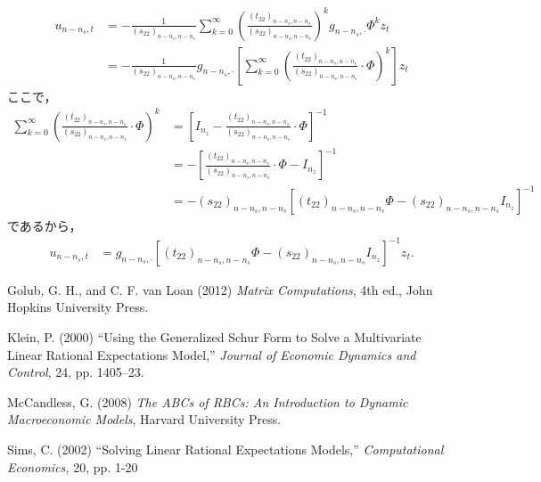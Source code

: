 \documentclass[a4j, dvipdfmx]{jarticle}
\begin{document}
\begin{align*}
u_{n-n_s,t} &= - \frac{1}{(s_{22})_{n-n_s,n-n_s}} \sum_{k = 0}^\infty \left(\frac{(t_{22})_{n-n_s,n-n_s}}{(s_{22})_{n-n_s,n-n_s}}\right)^k g_{n-n_s,\cdot}\Phi^k z_t \\
&= - \frac{1}{(s_{22})_{n-n_s,n-n_s}} g_{n-n_s,\cdot} \left[\sum_{k = 0}^\infty \left(\frac{(t_{22})_{n-n_s,n-n_s}}{(s_{22})_{n-n_s,n-n_s}}\cdot\Phi\right)^k\right] z_t
\end{align*}
ここで，
\begin{align*}
\sum_{k = 0}^\infty \left(\frac{(t_{22})_{n-n_s,n-n_s}}{(s_{22})_{n-n_s,n-n_s}}\cdot\Phi\right)^k &= \left[I_{n_z} - \frac{(t_{22})_{n-n_s,n-n_s}}{(s_{22})_{n-n_s,n-n_s}}\cdot\Phi\right]^{-1}\\
&= - \left[\frac{(t_{22})_{n-n_s,n-n_s}}{(s_{22})_{n-n_s,n-n_s}}\cdot\Phi - I_{n_z}\right]^{-1}\\
&= - (s_{22})_{n-n_s,n-n_s} \left[(t_{22})_{n-n_s,n-n_s}\Phi - (s_{22})_{n-n_s,n-n_s} I_{n_z}\right]^{-1}
\end{align*}
であるから，
\begin{align*}
u_{n-n_s,t} &= g_{n-n_s,\cdot}[(t_{22})_{n-n_s,n-n_s}\Phi - (s_{22})_{n-n_s,n-n_s}I_{n_z}]^{-1}z_t.
\end{align*}


\begin{thebibliography}{xxx}

Golub, G. H., and C. F. van Loan (2012) {\it Matrix Computations}, 4th ed., John Hopkins University Press.

Klein, P. (2000) ``Using the Generalized Schur Form to Solve a Multivariate Linear Rational Expectations Model,'' {\it Journal of Economic Dynamics and Control}, 24, pp. 1405--23.

McCandless, G. (2008) {\it The ABCs of RBCs: An Introduction to Dynamic Macroeconomic Models}, Harvard University Press.

Sims, C. (2002) ``Solving Linear Rational Expectations Models,'' {\it Computational Economics,} 20, pp. 1-20
\end{thebibliography}
\end{document}
